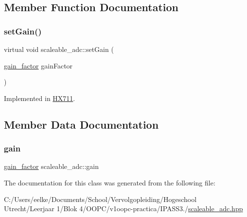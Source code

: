 \subsection{Member Function Documentation}
\mbox{\label{classscaleable__adc_ab208353fb3722efe3b9f101f17bf04df}} 
\subsubsection{\texorpdfstring{set\+Gain()}{setGain()}}
{\footnotesize\ttfamily virtual void scaleable\+\_\+adc\+::set\+Gain (\begin{DoxyParamCaption}\item[{\hyperlink{classscaleable__adc_a9d9f30302ee38e7249ae2d8b10eeac05}{gain\+\_\+factor}}]{gain\+Factor }\end{DoxyParamCaption})\hspace{0.3cm}{\ttfamily [pure virtual]}}



Implemented in \hyperlink{class_h_x711_af67074b3884c75769ba167a4e1e8252b}{H\+X711}.



\subsection{Member Data Documentation}
\mbox{\label{classscaleable__adc_a317cb5c4c9f6e820ab8104dec71852f6}} 
\subsubsection{\texorpdfstring{gain}{gain}}
{\footnotesize\ttfamily \hyperlink{classscaleable__adc_a9d9f30302ee38e7249ae2d8b10eeac05}{gain\+\_\+factor} scaleable\+\_\+adc\+::gain\hspace{0.3cm}{\ttfamily [protected]}}



The documentation for this class was generated from the following file\+:\begin{DoxyCompactItemize}
\item 
C\+:/\+Users/eelke/\+Documents/\+School/\+Vervolgopleiding/\+Hogeschool Utrecht/\+Leerjaar 1/\+Blok 4/\+O\+O\+P\+C/v1oopc-\/practica/\+I\+P\+A\+S\+S3./\hyperlink{scaleable__adc_8hpp}{scaleable\+\_\+adc.\+hpp}\end{DoxyCompactItemize}
